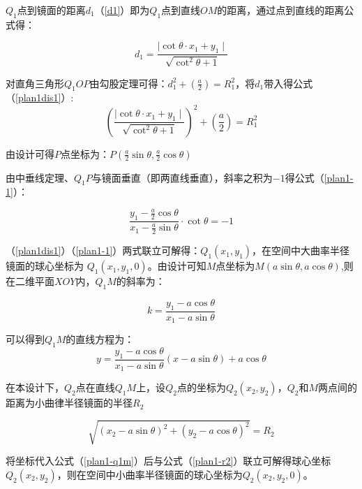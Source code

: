\documentclass[withoutpreface,bwprint]{cumcmthesis} %
\begin{document}
$Q_1$点到镜面的距离$d_1$（\ref{d1}）即为$Q_1$点到直线$OM$的距离，通过点到直线的距离公式得：

\begin{equation}
\label{d1}
	d_1 = \frac{\mid \mathop{cot}\theta \cdot x_1 + y_1 \mid}{\sqrt{\mathop{cot}^{2} \theta + 1}} 
\end{equation}

\par 对直角三角形$Q_1OP$由勾股定理可得：$ d_1^2 + \left( \frac{a}{2} \right) = R_1^2$，将$d_1$带入得公式（\ref{plan1dis1}）:
\begin{equation}
\label{plan1dis1}
	\left( \frac{\mid \mathop{cot}\theta \cdot x_1 + y_1 \mid}{\sqrt{\mathop{cot}^{2} \theta + 1}} \right)^2 +\left( \frac{a}{2} \right) = R_1^2
\end{equation}

\par 由设计可得$P$点坐标为：$P(\frac{a}{2} \mathop{sin} \theta, \frac{a}{2} \mathop{cos} \theta)$

\par 由中垂线定理、$Q_1P$与镜面垂直（即两直线垂直），斜率之积为$-1$得公式（\ref{plan1-1}）：

\begin{equation}
\label{plan1-1}
	\frac{y_1 - \frac{a}{2} \mathop{cos} \theta}{x_1 - \frac{a}{2} \mathop{sin} \theta} \cdot \mathop{cot}\theta = -1
\end{equation}

\par （\ref{plan1dis1}）（\ref{plan1-1}）两式联立可解得：$Q_1(x_1,y_1)$，在空间中大曲率半径镜面的球心坐标为 $Q_1(x_1,y_1,0)$。由设计可知$M$点坐标为$M(a \mathop{sin} \theta, a \mathop{cos} \theta)$,则在二维平面$XOY$内，$Q_1M$的斜率为：

$$k = \frac{y_1 - a \mathop{cos} \theta}{x_1 - a \mathop{sin} \theta}$$
 
\par 可以得到$Q_1M$的直线方程为：
\begin{equation}
\label{plan1-q1m}
	y = \frac{y_1 - a \mathop{cos} \theta}{x_1 - a \mathop{sin} \theta} (x - a \mathop{sin} \theta ) + a \mathop{cos} \theta
\end{equation}

在本设计下，$Q_2$点在直线$Q_1M$上，设$Q_2$点的坐标为$Q_2(x_2, y_2)$，$Q_2$和$M$两点间的距离为小曲律半径镜面的半径$R_2$

\begin{equation}
\label{plan1-r2}
	\sqrt{(x_2 - a \mathop{sin}\theta )^2 + (y_2 - a \mathop{cos}\theta )^2} = R_2
\end{equation}
\par 将坐标代入公式（\ref{plan1-q1m}）后与公式（\ref{plan1-r2}）联立可解得球心坐标$Q_2(x_2,y_2)$，则在空间中小曲率半径镜面的球心坐标为$Q_2(x_2,y_2,0)$。
\end{document}
